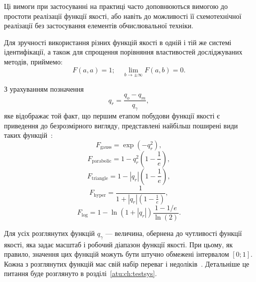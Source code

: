 Ці вимоги при застосуванні на практиці часто доповнюються
вимогою до простоти реалізації функції якості, або навіть до
можливості її схемотехнічної реалізації без застосування
елементів обчислювальної техніки.

Для зручності використання різних функцій якості в одній і
тій же системі ідентифікації, а також для спрощення порівняння
властивостей досліджуваних методів, приймемо:
%
\begin{equation}
  F(a,a) = 1;
  \quad
  \lim\limits_{b \to \pm \infty } F(a,b) = 0.
  \label{atu:eq:F_scale}
\end{equation}




З урахуванням позначення
\begin{equation}
  q_r = \frac{q_o - q_m}{q_\gamma},
\label{atu:eq:q_r}
\end{equation}
%
\noindent
яке відображає той факт, що першим етапом побудови функції якості
є приведення до безрозмірного вигляду, представлені найбільш
поширені види таких функцій~\cite{atu_ISDMCI2016,atu_asau24}:
%
\begin{equation}
  F_{\mathrm{gauss}} = \exp( - q_r^2 ),
\label{atu:eq:F_gauss}
\end{equation}
%
\begin{equation}
  F_{\mathrm{parabolic}} = 1 - q_r^2 \left( 1 - \frac{1}{e} \right),
\label{atu:eq:F_parabolic}
\end{equation}
%
\begin{equation}
  F_{\mathrm{triangle}} = 1 - |q_r| \left( 1 - \frac{1}{e} \right),
\label{atu:eq:F_triangle}
\end{equation}
%
\begin{equation}
  F_{\mathrm{hyper}} = \frac{1}{ 1 + |q_r| \left( 1 - \frac{1}{e} \right)},
\label{atu:eq:F_hyper}
\end{equation}
%
\begin{equation}
  F_{\mathrm{log}} = 1 - \ln \left( 1 + |q_r| \right) \frac{1-1/e}{\ln(2)}.
\label{atu:eq:F_log}
\end{equation}

Для усіх розглянутих функцій $q_\gamma$ --- величина, обернена до чутливості функції якості,
яка задає масштаб і робочий діапазон функції якості.
При цьому, як правило, значення цих функцій можуть бути штучно
обмежені інтервалом
$ [0; 1] $. Кожна з розглянутих функцій має свій набір переваг і
недоліків~\cite{atu_ISDMCI2016}. Детальніше це питання буде розглянуто
в розділі~\ref{atu:ch:testsys}.

